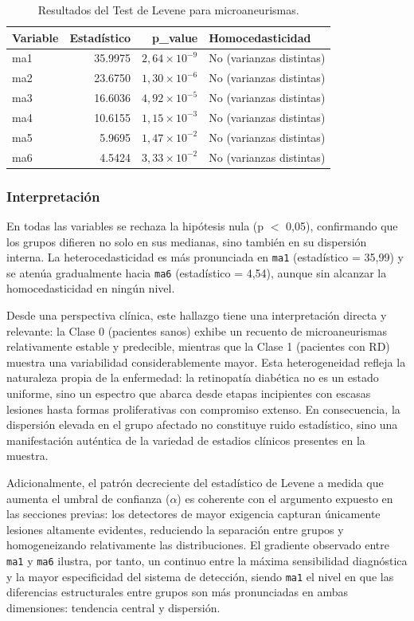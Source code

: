 \begin{table}[htbp]
\centering
\caption{Resultados del Test de Levene para microaneurismas.}
\begin{tabular}{lrrl}
\toprule
Variable & Estadístico & p\_value & Homocedasticidad \\
\midrule
ma1 & 35.9975 & $2{,}64 \times 10^{-9}$  & No (varianzas distintas) \\
ma2 & 23.6750 & $1{,}30 \times 10^{-6}$  & No (varianzas distintas) \\
ma3 & 16.6036 & $4{,}92 \times 10^{-5}$  & No (varianzas distintas) \\
ma4 & 10.6155 & $1{,}15 \times 10^{-3}$  & No (varianzas distintas) \\
ma5 &  5.9695 & $1{,}47 \times 10^{-2}$  & No (varianzas distintas) \\
ma6 &  4.5424 & $3{,}33 \times 10^{-2}$  & No (varianzas distintas) \\
\bottomrule
\end{tabular}
\end{table}

\subsubsection{Interpretación}

En todas las variables se rechaza la hipótesis nula (p $<$ 0,05), confirmando que los
grupos difieren no solo en sus medianas, sino también en su dispersión interna. La
heterocedasticidad es más pronunciada en \texttt{ma1} (estadístico = 35,99) y se atenúa
gradualmente hacia \texttt{ma6} (estadístico = 4,54), aunque sin alcanzar la
homocedasticidad en ningún nivel.

Desde una perspectiva clínica, este hallazgo tiene una interpretación directa y relevante:
la Clase 0 (pacientes sanos) exhibe un recuento de microaneurismas relativamente estable
y predecible, mientras que la Clase 1 (pacientes con RD) muestra una variabilidad
considerablemente mayor. Esta heterogeneidad refleja la naturaleza propia de la
enfermedad: la retinopatía diabética no es un estado uniforme, sino un espectro que
abarca desde etapas incipientes con escasas lesiones hasta formas proliferativas con
compromiso extenso. En consecuencia, la dispersión elevada en el grupo afectado no
constituye ruido estadístico, sino una manifestación auténtica de la variedad de
estadios clínicos presentes en la muestra.

Adicionalmente, el patrón decreciente del estadístico de Levene a medida que aumenta
el umbral de confianza ($\alpha$) es coherente con el argumento expuesto en las secciones
previas: los detectores de mayor exigencia capturan únicamente lesiones altamente
evidentes, reduciendo la separación entre grupos y homogeneizando relativamente las
distribuciones. El gradiente observado entre \texttt{ma1} y \texttt{ma6} ilustra, por
tanto, un continuo entre la máxima sensibilidad diagnóstica y la mayor especificidad del
sistema de detección, siendo \texttt{ma1} el nivel en que las diferencias estructurales
entre grupos son más pronunciadas en ambas dimensiones: tendencia central y dispersión.

